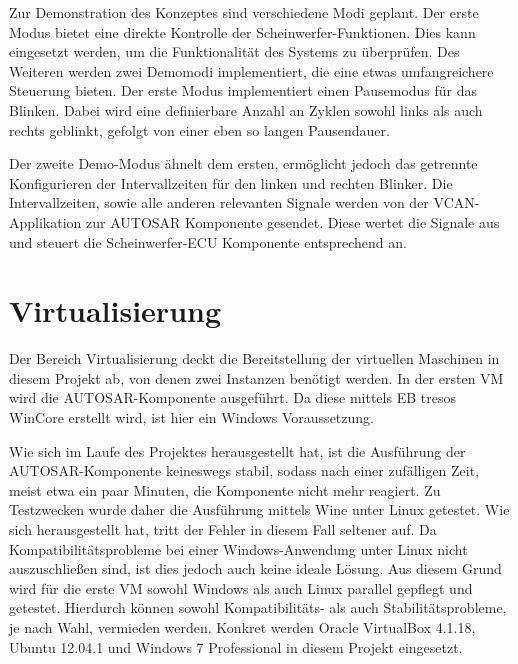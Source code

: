 \documentclass[
  a4paper,					    %
  twoside,
  DIV=calc,     				%
  bibliography=totoc,
  cleardoublepage=empty,
  ngerman,     					%
  final       					%
]{scrbook}
\begin{document}
Zur Demonstration des Konzeptes sind verschiedene Modi geplant. Der erste Modus bietet eine direkte Kontrolle der Scheinwerfer-Funktionen. Dies kann eingesetzt werden, um die Funktionalität des Systems zu überprüfen. Des Weiteren werden zwei Demomodi implementiert, die eine etwas umfangreichere Steuerung bieten. Der erste Modus implementiert einen Pausemodus für das Blinken. Dabei wird eine definierbare Anzahl an Zyklen sowohl links als auch rechts geblinkt, gefolgt von einer eben so langen Pausendauer.

Der zweite Demo-Modus ähnelt dem ersten, ermöglicht jedoch das getrennte Konfigurieren der Intervallzeiten für den linken und rechten Blinker. Die Intervallzeiten, sowie alle anderen relevanten Signale werden von der VCAN-Applikation zur AUTOSAR Komponente gesendet. Diese wertet die Signale aus und steuert die Scheinwerfer-ECU Komponente entsprechend an.




\section{Virtualisierung}
\label{sec:Virtualisierung_Umgesetzt}
Der Bereich Virtualisierung deckt die Bereitstellung der virtuellen Maschinen in diesem Projekt ab, von denen zwei Instanzen benötigt werden. In der ersten VM wird die AUTOSAR-Komponente ausgeführt. Da diese mittels EB tresos WinCore erstellt wird, ist hier ein Windows Voraussetzung.

Wie sich im Laufe des Projektes herausgestellt hat, ist die Ausführung der AUTOSAR-Komponente keineswegs stabil, sodass nach einer zufälligen Zeit, meist etwa ein paar Minuten, die Komponente nicht mehr reagiert. Zu Testzwecken wurde daher die Ausführung mittels Wine unter Linux getestet. Wie sich herausgestellt hat, tritt der Fehler in diesem Fall seltener auf. Da Kompatibilitätsprobleme bei einer Windows-Anwendung unter Linux nicht auszuschließen sind, ist dies jedoch auch keine ideale Lösung. Aus diesem Grund wird für die erste VM sowohl Windows als auch Linux parallel gepflegt und getestet. Hierdurch können sowohl Kompatibilitäts- als auch Stabilitätsprobleme, je nach Wahl, vermieden werden. Konkret werden Oracle VirtualBox 4.1.18, Ubuntu 12.04.1 und Windows 7 Professional in diesem Projekt eingesetzt.
\end{document}
